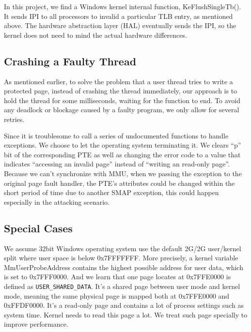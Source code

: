In this project, we find a Windows kernel internal function, KeFlushSingleTb(). It sends IPI to all processors to invalid a particular TLB entry, as mentioned above. The hardware abstraction layer (HAL) eventually sends the IPI, so the kernel does not need to mind the actual hardware differences.


\subsection{Crashing a Faulty Thread}

As mentioned earlier, to solve the problem that a user thread tries to write a protected page, instead of crashing the thread immediately, our approach is to hold the thread for some milliseconds, waiting for the function to end. To avoid any deadlock or blockage caused by a faulty program, we only allow for several retries. 

Since it is troublesome to call a series of undocumented functions to handle exceptions. We choose to let the operating system terminating it. We clears ``p'' bit of the corresponding PTE as well as changing the error code to a value that indicates ``accessing an invalid page'' instead of ``writing an read-only page''. Because we can't synchronize with MMU, when we passing the exception to the original page fault handler, the PTE's attributes could be changed within the short period of time due to another SMAP exception, this could happen especially in the attacking scenario. 



\subsection{Special Cases}
We assume 32bit Windows operating system use the default 2G/2G user/kernel split where user space is below 0x7FFFFFFF. More precisely, a kernel variable MmUserProbeAddress contains the highest possible address for user data, which is set to 0x7FFF0000. And we learn that one page locates at 0x7FFE0000 is defined as \texttt{USER\_SHARED\_DATA}. It's a shared page between user mode and kernel mode, meaning the same physical page is mapped both at 0x7FFE0000 and 0xFFDF0000. It's a read-only page and contains a lot of process settings such as system time. Kernel needs to read this page a lot. We treat such page specially to improve performance. 


